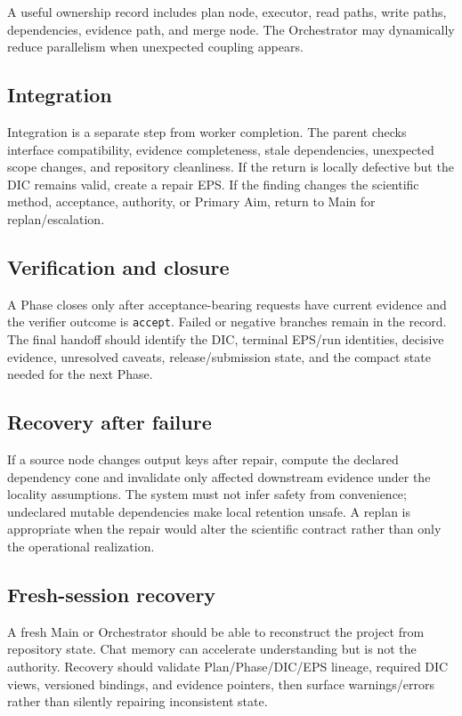 \documentclass[11pt,a4paper]{article}
\begin{document}
A useful ownership record includes plan node, executor, read paths, write paths, dependencies, evidence path, and merge node. The Orchestrator may dynamically reduce parallelism when unexpected coupling appears.

\subsection{Integration}
Integration is a separate step from worker completion. The parent checks interface compatibility, evidence completeness, stale dependencies, unexpected scope changes, and repository cleanliness. If the return is locally defective but the DIC remains valid, create a repair EPS. If the finding changes the scientific method, acceptance, authority, or Primary Aim, return to Main for replan/escalation.

\subsection{Verification and closure}
A Phase closes only after acceptance-bearing requests have current evidence and the verifier outcome is \texttt{accept}. Failed or negative branches remain in the record. The final handoff should identify the DIC, terminal EPS/run identities, decisive evidence, unresolved caveats, release/submission state, and the compact state needed for the next Phase.

\subsection{Recovery after failure}
If a source node changes output keys after repair, compute the declared dependency cone and invalidate only affected downstream evidence under the locality assumptions. The system must not infer safety from convenience; undeclared mutable dependencies make local retention unsafe. A replan is appropriate when the repair would alter the scientific contract rather than only the operational realization.

\subsection{Fresh-session recovery}
A fresh Main or Orchestrator should be able to reconstruct the project from repository state. Chat memory can accelerate understanding but is not the authority. Recovery should validate Plan/Phase/DIC/EPS lineage, required DIC views, versioned bindings, and evidence pointers, then surface warnings/errors rather than silently repairing inconsistent state.
\end{document}
